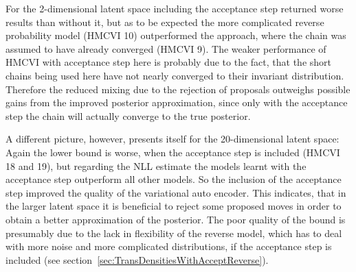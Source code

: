 For the 2-dimensional latent space including the acceptance step returned worse results than without it, but as to be expected the more complicated reverse probability model (HMCVI 10) outperformed the approach, where the chain was assumed to have already converged (HMCVI 9). The weaker performance of HMCVI with acceptance step here is probably due to the fact, that the short chains being used here have not nearly converged to their invariant distribution. Therefore the reduced mixing due to the rejection of proposals outweighs possible gains from the improved posterior approximation, since only with the acceptance step the chain will actually converge to the true posterior. 

A different picture, however, presents itself for the 20-dimensional latent space: Again the lower bound is worse, when the acceptance step is included (HMCVI 18 and 19), but regarding the NLL estimate the models learnt with the acceptance step outperform all other models. So the inclusion of the acceptance step improved the quality of the variational auto encoder. This indicates, that in the larger latent space it is beneficial to reject some proposed moves in order to obtain a better approximation of the posterior. The poor quality of the bound is presumably due to the lack in flexibility of the reverse model, which has to deal with more noise and more complicated distributions, if the acceptance step is included (see section~\ref{sec:TransDensitiesWithAcceptReverse}).